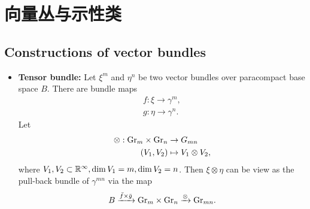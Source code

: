 \chapter{向量丛与示性类}
    \section{Constructions of vector bundles}
        \begin{itemize}
            \item \textbf{Tensor bundle:} Let $\xi^m$ and $\eta^n$ 
            be two vector bundles over paracompact base space $B$. 
            There are bundle maps 
            \begin{gather*}
            f:\xi\rightarrow\gamma^m, \\
            g:\eta\rightarrow\gamma^n.
            \end{gather*}
            Let 
            \begin{align*}
                \otimes:\mathrm{Gr}_m\times \mathrm{Gr}_n&\rightarrow G_{mn} \\
                (V_1,V_2)&\mapsto V_1\otimes V_2, 
            \end{align*}
            where $V_1, V_2\subset\mathbb{R}^{\infty}, \dim V_1 = m, \dim V_2 = n$. 
            Then $\xi\otimes\eta$ can be view as the pull-back bundle of $\gamma^{mn}$ via the map 
            \begin{equation*}
                B\xrightarrow{\bar{f}\times\bar{g}}\mathrm{Gr}_m\times \mathrm{Gr}_n\xrightarrow{\otimes}\mathrm{Gr}_{mn}.
            \end{equation*}
        \end{itemize}